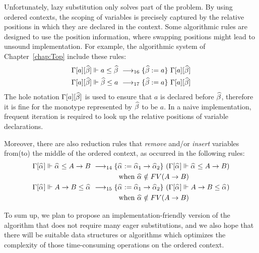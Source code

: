 Unfortunately, lazy substitution only solves part of the problem.
By using ordered contexts, the scoping of variables is precisely captured by
the relative positions in which they are declared in the context.
Some algorithmic rules are designed to use the position information,
where swapping positions might lead to unsound implementation.
For example, the algorithmic system of Chapter~\ref{chap:Top}
include these rules:
\begin{gather*}
\begin{aligned}
    \Gm[a][\bt] \Vdash a \le \bt &\rrule{16} \{\bt := a\}~\Gm[a][\bt]\\
    \Gm[a][\bt] \Vdash \bt \le a &\rrule{17} \{\bt := a\}~\Gm[a][\bt]\\
\end{aligned}
\end{gather*}
The hole notation $\Gm[a][\bt]$ is used to ensure that $a$ is declared before $\bt$,
therefore it is fine for the monotype represented by $\bt$ to be $a$.
In a naive implementation, frequent iteration is required to look up the
relative positions of variable declarations.

Moreover, there are also reduction rules that \emph{remove}
and/or \emph{insert} variables from(to) the middle of the ordered context,
as occurred in the following rules:
\begin{gather*}
\begin{aligned}
\Gm[\al] \Vdash \al \le A\to B &\rrule{14}
    \{\al := \al[1] \to \al[2]\}~(\Gm[\al] \Vdash \al \le A\to B)\\
    &\qquad\qquad \text{when } \al\notin FV(A \to B)\\
\Gm[\al] \Vdash A\to B \le \al &\rrule{15}
    \{\al := \al[1] \to \al[2]\}~(\Gm[\al] \Vdash A\to B \le \al)\\
    &\qquad\qquad \text{when } \al\notin  FV(A \to B)\\
\end{aligned}
\end{gather*}

To sum up,
we plan to propose an implementation-friendly version of the algorithm
that does not require many eager substitutions,
and we also hope that there will be suitable data structures or algorithms
which optimizes the complexity of those time-consuming operations on the ordered context.



